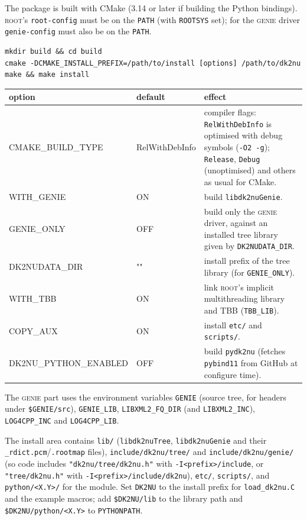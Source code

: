 \documentclass[11pt]{article}
\newcommand{\code}[1]{\texttt{#1}}
\newcommand{\genie}{\textsc{genie}\xspace}
\newcommand{\ROOT}{\textsc{root}\xspace}
\begin{document}
The package is built with CMake (3.14 or later if building the Python
bindings).  \ROOT's \code{root-config} must be on the \code{PATH}
(with \code{ROOTSYS} set); for the \genie driver \code{genie-config} must
also be on the \code{PATH}.
\begin{lstlisting}[style=plain]
mkdir build && cd build
cmake -DCMAKE_INSTALL_PREFIX=/path/to/install [options] /path/to/dk2nu
make && make install
\end{lstlisting}

\begin{center}\small
\begin{tabularx}{\textwidth}{>{\ttfamily}l >{\ttfamily}l X}
\toprule
\textrm{\textbf{option}} & \textrm{\textbf{default}} & \textbf{effect} \\ \midrule
CMAKE\_BUILD\_TYPE & RelWithDebInfo & compiler flags: \code{RelWithDebInfo}
   is optimised with debug symbols (\code{-O2 -g}); \code{Release},
   \code{Debug} (unoptimised) and others as usual for CMake. \\
WITH\_GENIE & ON & build \code{libdk2nuGenie}. \\
GENIE\_ONLY & OFF & build only the \genie driver, against an installed
   tree library given by \code{DK2NUDATA\_DIR}. \\
DK2NUDATA\_DIR & "" & install prefix of the tree library (for
   \code{GENIE\_ONLY}). \\
WITH\_TBB & ON & link \ROOT's implicit multithreading library and TBB
   (\code{TBB\_LIB}). \\
COPY\_AUX & ON & install \code{etc/} and \code{scripts/}. \\
DK2NU\_PYTHON\_ENABLED & OFF & build \code{pydk2nu} (fetches
   \code{pybind11} from GitHub at configure time). \\
\bottomrule
\end{tabularx}
\end{center}

The \genie part uses the environment variables \code{GENIE} (source tree,
for headers under \code{\$GENIE/src}), \code{GENIE\_LIB},
\code{LIBXML2\_FQ\_DIR} (and \code{LIBXML2\_INC}), \code{LOG4CPP\_INC} and
\code{LOG4CPP\_LIB}.

The install area contains \code{lib/} (\code{libdk2nuTree},
\code{libdk2nuGenie} and their \code{\_rdict.pcm}/\code{.rootmap} files),
\code{include/dk2nu/tree/} and \code{include/dk2nu/genie/} (so code
includes \code{"dk2nu/tree/dk2nu.h"} with \code{-I<prefix>/include}, or
\code{"tree/dk2nu.h"} with \code{-I<prefix>/include/dk2nu}),
\code{etc/}, \code{scripts/}, and \code{python/<X.Y>/} for the module.
Set \code{DK2NU} to the install prefix for \code{load\_dk2nu.C} and the
example macros; add \code{\$DK2NU/lib} to the library path and
\code{\$DK2NU/python/<X.Y>} to \code{PYTHONPATH}.
\end{document}
